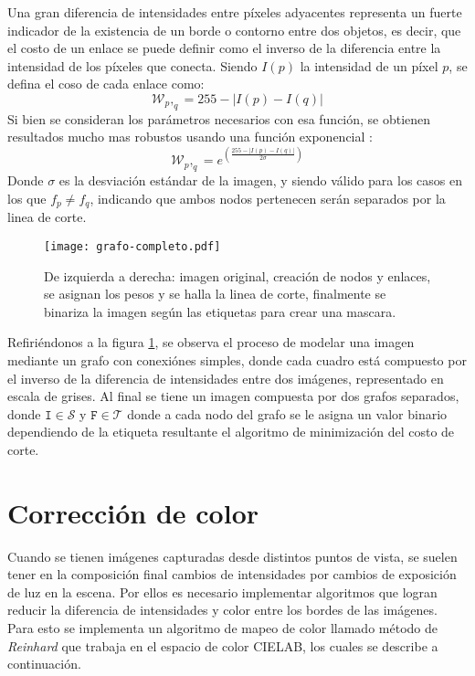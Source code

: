 Una gran diferencia de intensidades entre píxeles adyacentes representa un fuerte indicador de la existencia de un borde o contorno entre dos objetos, es decir, que el costo de un enlace se puede definir como el inverso de la diferencia entre la intensidad de los píxeles que conecta. Siendo $I(p)$ la intensidad de un píxel $p$, se defina el coso de cada enlace como:
\begin{equation}
\mathcal{W}_p,_q = 255 - |I(p) - I (q)|
\label{costo-corte}
\end{equation}
Si bien se consideran los parámetros necesarios con esa función, se obtienen resultados mucho mas robustos usando una función exponencial \cite{graph-opencv}:
\begin{equation}
\mathcal{W}_p,_q = e^{\left(\frac{255-|I(p) - I (q)|}{2 \sigma}  \right) }
\label{costo-corte}
\end{equation}
Donde $\sigma$ es la desviación estándar de la imagen, y siendo válido para los casos en los que $f_p \neq f_q$, indicando que ambos nodos pertenecen serán separados por la linea de corte.

\begin{figure}[h]
	\centering
	\texttt{[image: grafo-completo.pdf]}
	\caption[Corte por grafo]{De izquierda a derecha: imagen original, creación de nodos y enlaces, se asignan los pesos y se halla la linea de corte, finalmente se binariza la imagen según las etiquetas para crear una mascara.}
	\label{imagen:grafo}
\end{figure}
Refiriéndonos a la figura \ref{imagen:grafo}, se observa el proceso de modelar una imagen mediante un grafo con conexiónes simples, donde cada cuadro está compuesto por el inverso de la diferencia de intensidades entre dos imágenes, representado en escala de grises. Al final se tiene un imagen compuesta por dos grafos separados, donde $\mathtt{I} \in \mathcal{S}$ y $\mathtt{F} \in \mathcal{T}$ donde a cada nodo del grafo se le asigna un valor binario dependiendo de la etiqueta resultante el algoritmo de minimización del costo de corte.


\section{Corrección de color}
Cuando se tienen imágenes capturadas desde distintos puntos de vista, se suelen tener en la composición final cambios de intensidades por cambios de exposición de luz en la escena. Por ellos es necesario implementar algoritmos que logran reducir la diferencia de intensidades y color entre los bordes de las imágenes. Para esto se implementa un algoritmo de mapeo de color llamado método de \textit{Reinhard} \cite{reinhard} que trabaja en el espacio de color CIELAB, los cuales se describe a continuación. 

